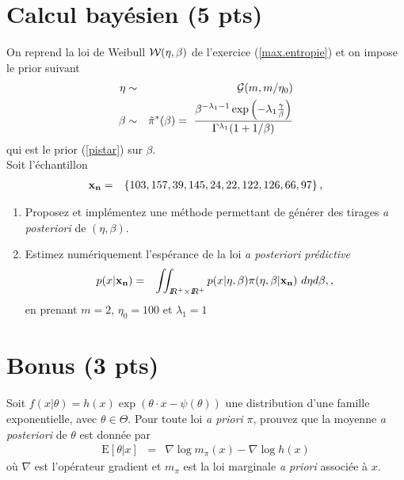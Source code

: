 \documentclass[10pt]{article}
\newcommand{\R}{I\!\!R}
\newcommand{\E}{\mbox{E}}
\newcommand{\1}{\mathbbm{1}}
\begin{document}
\section{Calcul bayésien (5 pts)}

On reprend la loi de Weibull ${\cal{W}}(\eta,\beta)$ de l'exercice (\ref{max.entropie}) et on impose le prior suivant
\begin{eqnarray*}
\eta & \sim & {\cal{G}}(m,m/\eta_0) \\
\beta & \sim & \tilde{\pi}^*(\beta)  = \ \frac{\beta^{-\lambda_1-1}\exp\left(-\lambda_1 \frac{\gamma}{\beta}\right)}{\Gamma^{\lambda_1}(1+1/\beta)}
\end{eqnarray*}
qui est le prior (\ref{pistar}) sur $\beta$. \\

Soit l'échantillon
\begin{eqnarray*}
{\bf x_n} & = & \left\{ 103, 157 , 39 ,145 , 24  ,22 ,122, 126 , 66 , 97\right\},
\end{eqnarray*}
\begin{enumerate}
\item Proposez et implémentez une méthode permettant de générer des tirages {\it a posteriori} de $(\eta,\beta)$. 
\item Estimez numériquement l'espérance de la loi {\it a posteriori prédictive} 
\begin{eqnarray*}
p(x|{\bf x_n}) & = & \iint_{\R^+\times\R^+} p(x|\eta,\beta) \pi(\eta,\beta|{\bf x_n}) \ d\eta d\beta,,
\end{eqnarray*}
 en prenant $m=2$, $\eta_0=100$ et $\lambda_1=1$ 
\end{enumerate}



\section{Bonus (3 pts) }

Soit $f(x|\theta) = h(x)\exp\left(\theta\cdot x - \psi(\theta)\right)$ une distribution d'une famille exponentielle, avec $\theta\in\Theta$. Pour toute loi {\it a priori} $\pi$, prouvez que la moyenne {\it a posteriori} de $\theta$ est donnée par
\begin{eqnarray*}
\E[\theta|x] & = & \nabla \log m_{\pi}(x) - \nabla \log h(x)
\end{eqnarray*}
où $\nabla$ est l'opérateur gradient et $m_{\pi}$ est la loi marginale {\it a priori} associée à $x$.
\end{document}
